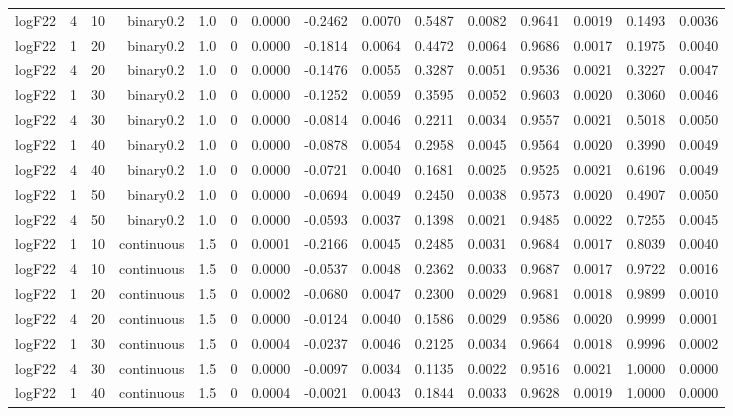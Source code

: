 \begin{longtable}{rrrrrrrrrrrrrrr}
  logF22 & 4 & 10 & binary0.2 & 1.0 & 0 & 0.0000 & -0.2462 & 0.0070 & 0.5487 & 0.0082 & 0.9641 & 0.0019 & 0.1493 & 0.0036 \\ 
  logF22 & 1 & 20 & binary0.2 & 1.0 & 0 & 0.0000 & -0.1814 & 0.0064 & 0.4472 & 0.0064 & 0.9686 & 0.0017 & 0.1975 & 0.0040 \\ 
  logF22 & 4 & 20 & binary0.2 & 1.0 & 0 & 0.0000 & -0.1476 & 0.0055 & 0.3287 & 0.0051 & 0.9536 & 0.0021 & 0.3227 & 0.0047 \\ 
  logF22 & 1 & 30 & binary0.2 & 1.0 & 0 & 0.0000 & -0.1252 & 0.0059 & 0.3595 & 0.0052 & 0.9603 & 0.0020 & 0.3060 & 0.0046 \\ 
  logF22 & 4 & 30 & binary0.2 & 1.0 & 0 & 0.0000 & -0.0814 & 0.0046 & 0.2211 & 0.0034 & 0.9557 & 0.0021 & 0.5018 & 0.0050 \\ 
  logF22 & 1 & 40 & binary0.2 & 1.0 & 0 & 0.0000 & -0.0878 & 0.0054 & 0.2958 & 0.0045 & 0.9564 & 0.0020 & 0.3990 & 0.0049 \\ 
  logF22 & 4 & 40 & binary0.2 & 1.0 & 0 & 0.0000 & -0.0721 & 0.0040 & 0.1681 & 0.0025 & 0.9525 & 0.0021 & 0.6196 & 0.0049 \\ 
  logF22 & 1 & 50 & binary0.2 & 1.0 & 0 & 0.0000 & -0.0694 & 0.0049 & 0.2450 & 0.0038 & 0.9573 & 0.0020 & 0.4907 & 0.0050 \\ 
  logF22 & 4 & 50 & binary0.2 & 1.0 & 0 & 0.0000 & -0.0593 & 0.0037 & 0.1398 & 0.0021 & 0.9485 & 0.0022 & 0.7255 & 0.0045 \\ 
  logF22 & 1 & 10 & continuous & 1.5 & 0 & 0.0001 & -0.2166 & 0.0045 & 0.2485 & 0.0031 & 0.9684 & 0.0017 & 0.8039 & 0.0040 \\ 
  logF22 & 4 & 10 & continuous & 1.5 & 0 & 0.0000 & -0.0537 & 0.0048 & 0.2362 & 0.0033 & 0.9687 & 0.0017 & 0.9722 & 0.0016 \\ 
  logF22 & 1 & 20 & continuous & 1.5 & 0 & 0.0002 & -0.0680 & 0.0047 & 0.2300 & 0.0029 & 0.9681 & 0.0018 & 0.9899 & 0.0010 \\ 
  logF22 & 4 & 20 & continuous & 1.5 & 0 & 0.0000 & -0.0124 & 0.0040 & 0.1586 & 0.0029 & 0.9586 & 0.0020 & 0.9999 & 0.0001 \\ 
  logF22 & 1 & 30 & continuous & 1.5 & 0 & 0.0004 & -0.0237 & 0.0046 & 0.2125 & 0.0034 & 0.9664 & 0.0018 & 0.9996 & 0.0002 \\ 
  logF22 & 4 & 30 & continuous & 1.5 & 0 & 0.0000 & -0.0097 & 0.0034 & 0.1135 & 0.0022 & 0.9516 & 0.0021 & 1.0000 & 0.0000 \\ 
  logF22 & 1 & 40 & continuous & 1.5 & 0 & 0.0004 & -0.0021 & 0.0043 & 0.1844 & 0.0033 & 0.9628 & 0.0019 & 1.0000 & 0.0000 \\ 

\end{longtable}
